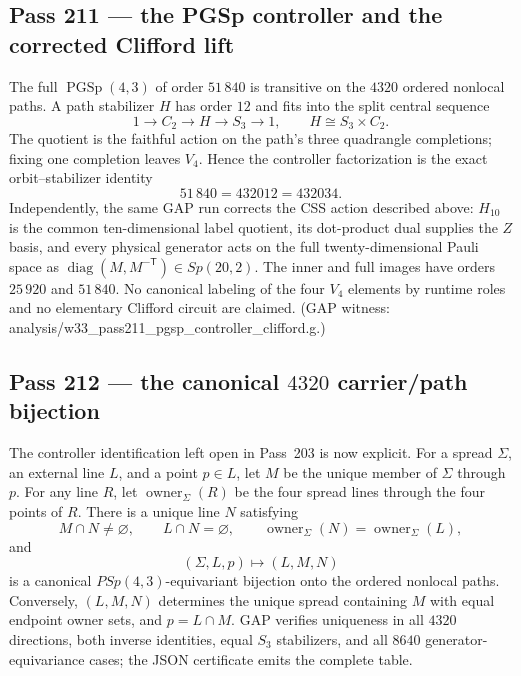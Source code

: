 \documentclass[12pt,a4paper]{article}
\def\mathrm#1{#1}%
\def\texttt#1{#1}%
\def\cdot{ }%
\theoremstyle{definition}
\newcommand{\Sp}{\mathrm{Sp}}
\newcommand{\PSp}{\mathrm{PSp}}
\begin{document}
\subsection{Pass 211 --- the PGSp controller and the corrected Clifford lift}
\label{ssec:pass211}

The full $\operatorname{PGSp}(4,3)$ of order $51\,840$ is transitive on the
$4320$ ordered nonlocal paths.  A path stabilizer $H$ has order $12$ and
fits into the split central sequence
\[
  1\longrightarrow C_2\longrightarrow H\longrightarrow S_3
  \longrightarrow1,
  \qquad H\cong S_3\times C_2.
\]
The quotient is the faithful action on the path's three quadrangle
completions; fixing one completion leaves $V_4$.  Hence the controller
factorization is the exact orbit--stabilizer identity
\[
  51\,840=4320\cdot12=4320\cdot3\cdot4.
\]
Independently, the same GAP run corrects the CSS action described above:
$H_{10}$ is the common ten-dimensional label quotient, its dot-product dual
supplies the $Z$ basis, and every physical generator acts on the full
twenty-dimensional Pauli space as
$\operatorname{diag}(M,M^{-\mathsf T})\in\Sp(20,2)$.  The inner and full
images have orders $25\,920$ and $51\,840$.  No canonical labeling of the
four $V_4$ elements by runtime roles and no elementary Clifford circuit are
claimed. (GAP witness:
\texttt{analysis/w33\_pass211\_pgsp\_controller\_clifford.g}.)

\subsection{Pass 212 --- the canonical $4320$ carrier/path bijection}
\label{ssec:pass212}

The controller identification left open in Pass~203 is now explicit.  For
a spread $\Sigma$, an external line $L$, and a point $p\in L$, let $M$ be
the unique member of $\Sigma$ through $p$.  For any line $R$, let
$\operatorname{owner}_{\Sigma}(R)$ be the four spread lines through the
four points of $R$.  There is a unique line $N$ satisfying
\[
  M\cap N\ne\varnothing,\qquad L\cap N=\varnothing,
  \qquad
  \operatorname{owner}_{\Sigma}(N)
    =\operatorname{owner}_{\Sigma}(L),
\]
and
\[
  \boxed{(\Sigma,L,p)\longmapsto(L,M,N)}
\]
is a canonical $\PSp(4,3)$-equivariant bijection onto the ordered nonlocal
paths.  Conversely, $(L,M,N)$ determines the unique spread containing $M$
with equal endpoint owner sets, and $p=L\cap M$.  GAP verifies uniqueness
in all $4320$ directions, both inverse identities, equal $S_3$ stabilizers,
and all $8640$ generator-equivariance cases; the JSON certificate emits the
complete table.
\end{document}
